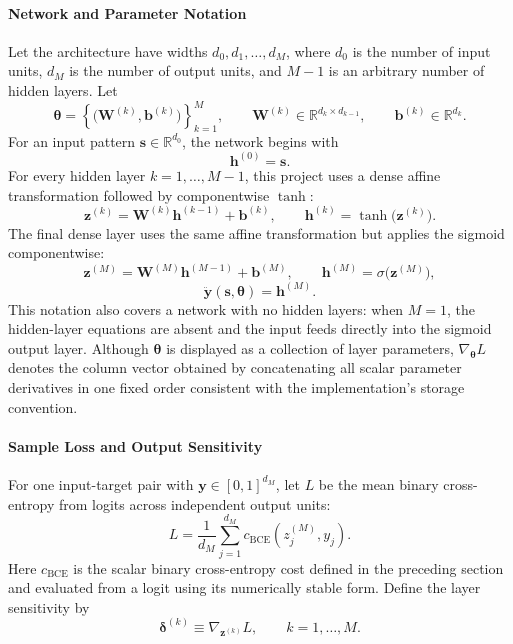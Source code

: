 \documentclass{article}
\begin{document}
\paragraph{Network and Parameter Notation}
Let the architecture have widths \(d_0,d_1,\ldots,d_M\), where \(d_0\)
is the number of input units, \(d_M\) is the number of output units, and
\(M-1\) is an arbitrary number of hidden layers. Let
\[
  \boldsymbol\theta
  =
  \left\{
    \bigl(\mathbf{W}^{(k)},\mathbf{b}^{(k)}\bigr)
  \right\}_{k=1}^{M},
  \qquad
  \mathbf{W}^{(k)}\in\mathbb{R}^{d_k\times d_{k-1}},
  \qquad
  \mathbf{b}^{(k)}\in\mathbb{R}^{d_k}.
\]
For an input pattern \(\mathbf{s}\in\mathbb{R}^{d_0}\), the network
begins with
\[
  \mathbf{h}^{(0)}=\mathbf{s}.
\]
For every hidden layer \(k=1,\ldots,M-1\), this project uses a dense
affine transformation followed by componentwise \(\tanh\):
\[
  \mathbf{z}^{(k)}
  =
  \mathbf{W}^{(k)}\mathbf{h}^{(k-1)}
  +
  \mathbf{b}^{(k)},
  \qquad
  \mathbf{h}^{(k)}
  =
  \tanh\bigl(\mathbf{z}^{(k)}\bigr).
\]
The final dense layer uses the same affine transformation but applies
the sigmoid componentwise:
\[
  \mathbf{z}^{(M)}
  =
  \mathbf{W}^{(M)}\mathbf{h}^{(M-1)}
  +
  \mathbf{b}^{(M)},
  \qquad
  \mathbf{h}^{(M)}
  =
  \sigma\bigl(\mathbf{z}^{(M)}\bigr),
\]
\[
  \ddot{\mathbf{y}}(\mathbf{s},\boldsymbol\theta)
  =
  \mathbf{h}^{(M)}.
\]
This notation also covers a network with no hidden layers: when
\(M=1\), the hidden-layer equations are absent and the input feeds
directly into the sigmoid output layer. Although
\(\boldsymbol\theta\) is displayed as a collection of layer parameters,
\(\nabla_{\boldsymbol\theta}L\) denotes the column vector obtained by
concatenating all scalar parameter derivatives in one fixed order
consistent with the implementation's storage convention.

\paragraph{Sample Loss and Output Sensitivity}
For one input-target pair with
\(\mathbf{y}\in[0,1]^{d_M}\), let \(L\) be the mean binary
cross-entropy from logits across independent output units:
\[
  L
  =
  \frac{1}{d_M}
  \sum_{j=1}^{d_M}
  c_{\mathrm{BCE}}\left(z_j^{(M)},y_j\right).
\]
Here \(c_{\mathrm{BCE}}\) is the scalar binary cross-entropy cost
defined in the preceding section and evaluated from a logit using its
numerically stable form. Define the layer sensitivity by
\[
  \boldsymbol{\delta}^{(k)}
  \equiv
  \nabla_{\mathbf{z}^{(k)}}L,
  \qquad
  k=1,\ldots,M.
\]
\end{document}
